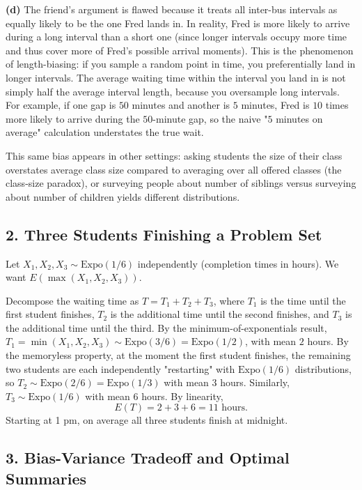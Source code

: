 \documentclass{article}
\begin{document}
\textbf{(d)} The friend's argument is flawed because it treats all inter-bus intervals as equally likely to be the one Fred lands in. In reality, Fred is more likely to arrive during a long interval than a short one (since longer intervals occupy more time and thus cover more of Fred's possible arrival moments). This is the phenomenon of length-biasing: if you sample a random point in time, you preferentially land in longer intervals. The average waiting time within the interval you land in is not simply half the average interval length, because you oversample long intervals. For example, if one gap is $50$ minutes and another is $5$ minutes, Fred is $10$ times more likely to arrive during the $50$-minute gap, so the naive "$5$ minutes on average" calculation understates the true wait.

This same bias appears in other settings: asking students the size of their class overstates average class size compared to averaging over all offered classes (the class-size paradox), or surveying people about number of siblings versus surveying about number of children yields different distributions.

\subsection*{2. Three Students Finishing a Problem Set}

Let $X_1, X_2, X_3 \sim \text{Expo}(1/6)$ independently (completion times in hours). We want $E(\max(X_1, X_2, X_3))$.

Decompose the waiting time as $T = T_1 + T_2 + T_3$, where $T_1$ is the time until the first student finishes, $T_2$ is the additional time until the second finishes, and $T_3$ is the additional time until the third. By the minimum-of-exponentials result, $T_1 = \min(X_1,X_2,X_3) \sim \text{Expo}(3/6) = \text{Expo}(1/2)$, with mean $2$ hours. By the memoryless property, at the moment the first student finishes, the remaining two students are each independently "restarting" with $\text{Expo}(1/6)$ distributions, so $T_2 \sim \text{Expo}(2/6) = \text{Expo}(1/3)$ with mean $3$ hours. Similarly, $T_3 \sim \text{Expo}(1/6)$ with mean $6$ hours. By linearity,
$$
E(T) = 2 + 3 + 6 = 11 \text{ hours}.
$$
Starting at 1 pm, on average all three students finish at midnight.

\subsection*{3. Bias-Variance Tradeoff and Optimal Summaries}
\end{document}
